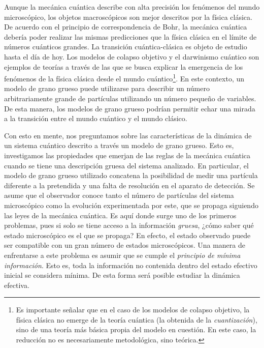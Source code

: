 Aunque la mecánica cuántica describe con alta precisión los fenómenos del mundo microscópico, los objetos macroscópicos son mejor descritos por la física clásica. De acuerdo con el principio de correspondencia de Bohr, la mecánica cuántica debería poder realizar las mismas predicciones que la física clásica en el límite de números cuánticos grandes. La transición cuántica-clásica es objeto de estudio hasta el día de hoy. Los modelos de colapso objetivo y el darwinismo cuántico son ejemplos de teorías a través de las que se busca explicar la emergencia de los fenómenos de la física clásica desde el mundo cuántico\footnote{Es importante señalar que en el caso de los modelos de colapso objetivo, la física clásica no emerge de la teoría cuántica (la obtenida de la \textit{cuantización}), sino de una teoría más básica propia del modelo en cuestión. En este caso, la reducción no es necesariamente metodológica, sino teórica.}. En este contexto, un modelo de grano grueso puede utilizarse para describir un número arbitrariamente grande de partículas utilizando un número pequeño de variables. De esta manera, los modelos de grano grueso podrían permitir echar una mirada a la transición entre el mundo cuántico y el mundo clásico.



Con esto en mente, nos preguntamos sobre las características de la dinámica de un sistema cuántico descrito a través un modelo de grano grueso. Esto es, investigamos las propiedades que emerjan de las reglas de la mecánica cuántica cuando se tiene una descripción gruesa del sistema analizado. En particular, el modelo de grano grueso utilizado concatena la posibilidad de medir una partícula diferente a la pretendida y una falta de resolución en el aparato de detección. Se asume que el observador conoce tanto el número de partículas del sistema microscópico como la evolución experimentada por este, que se propaga siguiendo las leyes de la mecánica cuántica. Es aquí donde surge uno de los primeros problemas, pues si solo se tiene acceso a la información \textit{gruesa}, ¿cómo saber qué estado microscópico es el que se propaga? En efecto, el estado observado puede ser compatible con un gran número de estados microscópicos. Una manera de enfrentarse a este problema es asumir que se cumple el \textit{principio de mínima información}. Esto es, toda la información no contenida dentro del estado efectivo inicial se considera mínima. De esta forma será posible estudiar la dinámica efectiva. 

